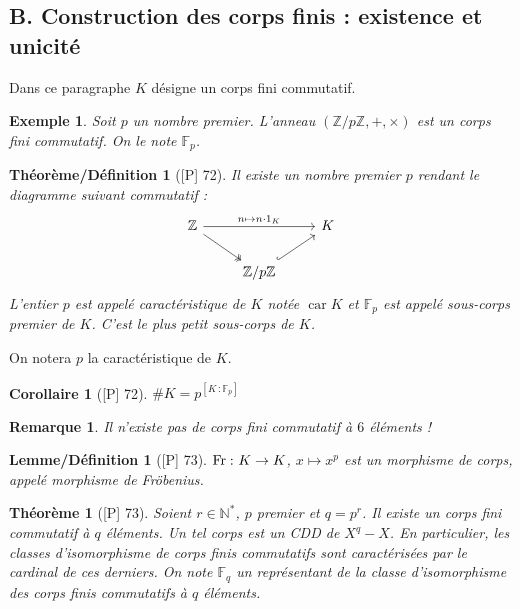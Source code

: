 \documentclass[10pt, a4paper, parskip=full, twoside, twocolumn]{report}
\newtheorem{theorem}[definition]{Théorème}
\newtheorem{theorem_def}[definition]{Théorème/Définition}
\newtheorem{lemma_def}[definition]{Lemme/Définition}
\newtheorem{corollary}[definition]{Corollaire}
\newtheorem{example}[definition]{Exemple}
\newtheorem{remark}[definition]{Remarque}
\newcommand{\IN}{\mathbb{N}}
\newcommand{\IZpZ}{\mathbb{Z}/p\mathbb{Z}}
\newcommand{\IF}{\mathbb{F}}
\DeclareMathOperator{\car}{car}
\begin{document}
\subsection*{B. Construction des corps finis : existence et unicité}

\textcolor{paragraphtext}{Dans ce paragraphe $K$ désigne un corps fini commutatif.}

\begin{example}
	Soit $p$ un nombre premier. L'anneau $(\IZpZ, +,\times )$ est un corps fini commutatif. On le note $\IF_p$.
\end{example}

\begin{theorem_def}[\textnormal{[P] 72}]
	Il existe un nombre premier $p$ rendant le diagramme suivant commutatif :
		$$\begin{tikzcd}
			{\mathbb{Z}} && K \\
			& {\mathbb{Z}/p\mathbb{Z}}
			\arrow["{n\mapsto n\cdot 1_K}", from=1-1, to=1-3]
			\arrow[two heads, from=1-1, to=2-2]
			\arrow[hook, from=2-2, to=1-3]
		\end{tikzcd}$$
	L'entier $p$ est appelé \emph{caractéristique} de $K$ notée $\car K$ et $\IF_p$ est appelé \emph{sous-corps premier de $K$}.
	C'est le plus petit sous-corps de $K$.
\end{theorem_def}

\textcolor{paragraphtext}{On notera $p$ la caractéristique de $K$.}

\begin{corollary}[\textnormal{[P] 72}]
	$\#K = p^{\left[K\,\colon \IF_p\right]}$
\end{corollary}
\begin{remark}
	Il n'existe pas de corps fini commutatif à $6$ éléments !
\end{remark}

\begin{lemma_def}[\textnormal{[P] 73}]
	$\textnormal{Fr}\,\colon K\to K$, $x\mapsto x^p$ est un morphisme de corps, appelé \emph{morphisme de Fröbenius}.
\end{lemma_def}

\begin{theorem}[\textnormal{[P] 73}]
	Soient $r\in \IN^*$, $p$ premier et $q=p^r$. Il existe un corps fini commutatif à $q$ éléments.
	Un tel corps est un CDD de $X^q - X$. En particulier, les classes d'isomorphisme de corps finis commutatifs sont caractérisées par le cardinal de ces derniers.
	On note $\IF_q$ un représentant de la classe d'isomorphisme des corps finis commutatifs à $q$ éléments.
\end{theorem}
\end{document}
